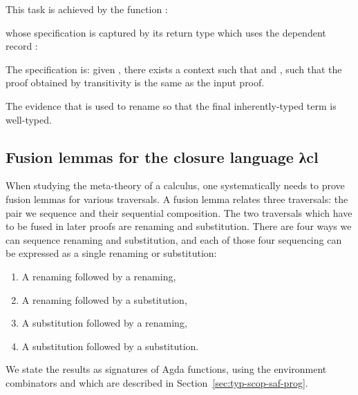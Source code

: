\documentclass[bsc,frontabs,oneside,singlespacing,parskip,deptreport]{infthesis}
\theoremstyle{definition}
\begin{document}
This task is achieved by the function :


whose specification is captured by its return type which uses the
dependent record :


The specification is: given , there exists a context
 such that  and , such that the
proof  obtained by transitivity is the same as the input
proof.

The evidence that  is used to rename  so that
the final inherently-typed term is well-typed.

\subsection{Fusion lemmas for the closure language λcl}

When studying the meta-theory of a calculus, one systematically needs
to prove fusion lemmas for various traversals. A fusion lemma relates
three traversals: the pair we sequence and their sequential
composition. The two traversals which have to be fused in later proofs
are renaming and substitution. There are four ways we can sequence
renaming and substitution, and each of those four sequencing can be
expressed as a single renaming or substitution:

\begin{enumerate}[nolistsep]
  \item A renaming followed by a renaming,
  \item A renaming followed by a substitution,
  \item A substitution followed by a renaming,
  \item A substitution followed by a substitution.
\end{enumerate}

We state the results as signatures of Agda functions, using the
environment combinators \AS{\_<\$>\_} and  which are described
in Section~\ref{sec:typ-scop-saf-prog}.

\end{document}
